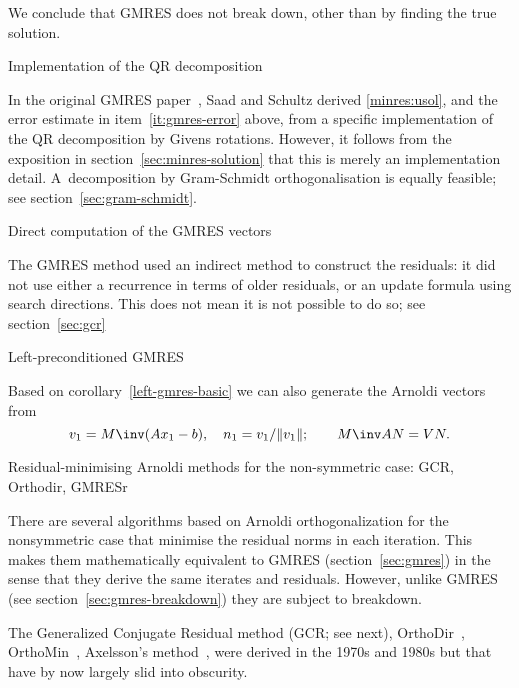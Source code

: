 \documentclass[11pt]{artikel3}
\begin{document}
\begin{Outline}
We conclude that GMRES does not break down, other than by finding the
true solution.

 {Implementation of the QR decomposition}

In the original GMRES paper~\cite{SaadSchultz:gmres}, Saad and Schultz
derived \eqref{minres:usol}, and the error estimate in
item~\ref{it:gmres-error} above, from a specific implementation of the
QR decomposition by Givens rotations.  However, it follows from the
exposition in section~\ref{sec:minres-solution} that this is merely an
implementation detail.  A~decomposition by
Gram-Schmidt orthogonalisation is equally
feasible; see section~\ref{sec:gram-schmidt}.

 {Direct computation of the GMRES vectors}
\label{sec:gmresr}

The GMRES method used an indirect method to construct the residuals:
it did not use either a recurrence in terms of older residuals, or
an update formula using search directions. This does not mean it is
not possible to do so; see section~\ref{sec:gcr}

 {Left-preconditioned GMRES}

Based on corollary~\ref{left-gmres-basic} we can also generate the
Arnoldi vectors from
\[ v_1=M\inv(Ax_1-b),\quad n_1=v_1/\|v_1\|; \qquad M\inv AN=VN. \]


 {Residual-minimising Arnoldi methods for the non-symmetric
case: GCR, Orthodir, GMRESr}
\label{sec:gcr}

There are several algorithms based on Arnoldi orthogonalization
for the nonsymmetric case that minimise the residual norms in each iteration.
This makes them mathematically equivalent to GMRES
(section~\ref{sec:gmres}) in the sense that
they derive the same iterates and residuals.
However, unlike GMRES (see section~\ref{sec:gmres-breakdown})
they are subject to breakdown.

The Generalized Conjugate Residual method (GCR; see next),
OrthoDir~\cite{YoungJea1980:generalizedcg},
OrthoMin~\cite{Vi:orthomin}, Axelsson's
method~\cite{Ax:unsymmetricinconsistent},
were derived in the 1970s and 1980s but that have by now largely
slid into obscurity.


\end{Outline}
\end{document}
